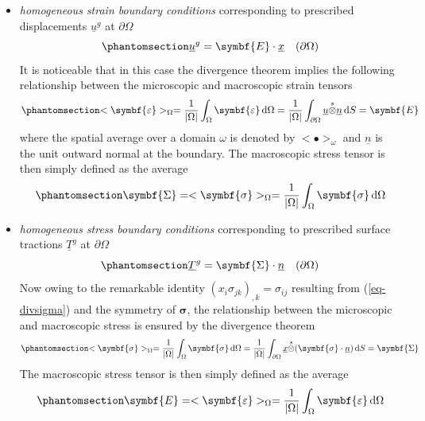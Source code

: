 \documentclass[
  a4paper,
  numbers=noendperiod,
  DIV=12]{scrreprt}
\newcommand{\uu}[1]{{\symbf{{#1}}}}
\newcommand{\uv}[1]{{\underline{{#1}}}}
\newcommand{\x}{{\uv{{x}}}}
\newcommand{\n}{{\uv{{n}}}}
\newcommand{\eps}{{\uu{{\varepsilon}}}}
\newcommand{\E}{{\uu{{E}}}}
\newcommand{\sig}{{\uu{{\sigma}}}}
\newcommand{\Sig}{{\uu{{\Sigma}}}}
\newcommand{\sotimes}{{\stackrel{s}{\otimes}}}
\newcommand{\ud}{{\,\mathrm{d}}}
\begin{document}
\begin{itemize}
\item
  \emph{homogeneous strain boundary conditions} corresponding to
  prescribed displacements \(\uv{u}^g\) at \(\partial\Omega\)
  \begin{equation}\protect\phantomsection\label{eq-homstrainBC}{
  \uv{u}^g=\E\cdot\x \quad(\partial\Omega)
  }\end{equation} It is noticeable that in this case the divergence
  theorem implies the following relationship between the microscopic and
  macroscopic strain tensors
  \begin{equation}\protect\phantomsection\label{eq-EhomstrainBC}{
  <\eps>_{\Omega}=\frac{1}{\lvert \Omega \rvert}\int_\Omega \eps\ud \Omega
  =\frac{1}{\lvert \Omega \rvert}\int_{\partial\Omega} \uv{u}\sotimes\n \ud S
  =\E
  }\end{equation} where the spatial average over a domain \(\omega\) is
  denoted by \(<\bullet>_\omega\) and \(\n\) is the unit outward normal
  at the boundary. The macroscopic stress tensor is then simply defined
  as the average
  \begin{equation}\protect\phantomsection\label{eq-ShomstrainBC}{
  \Sig=
  <\sig>_{\Omega}=\frac{1}{\lvert \Omega \rvert}\int_\Omega \sig\ud \Omega
  }\end{equation}
\item
  \emph{homogeneous stress boundary conditions} corresponding to
  prescribed surface tractions \(\uv{T}^g\) at \(\partial\Omega\)
  \begin{equation}\protect\phantomsection\label{eq-homstressBC}{
  \uv{T}^g=\Sig\cdot\n \quad(\partial\Omega)
  }\end{equation} Now owing to the remarkable identity
  \((x_i\sigma_{jk})_{,k}=\sigma_{ij}\) resulting from
  (\ref{eq-divsigma}) and the symmetry of \(\sig\), the relationship
  between the microscopic and macroscopic stress is ensured by the
  divergence theorem
  \begin{equation}\protect\phantomsection\label{eq-ShomstressBC}{
  <\sig>_{\Omega}=\frac{1}{\lvert \Omega \rvert}\int_\Omega \sig\ud \Omega
  =\frac{1}{\lvert \Omega \rvert}\int_{\partial\Omega} \x\sotimes(\sig\cdot\n) \ud S
  =\Sig
  }\end{equation} The macroscopic stress tensor is then simply defined
  as the average
  \begin{equation}\protect\phantomsection\label{eq-EhomstressBC}{
  \E=
  <\eps>_{\Omega}=\frac{1}{\lvert \Omega \rvert}\int_\Omega \eps\ud \Omega
  }\end{equation}
\end{itemize}
\end{document}
